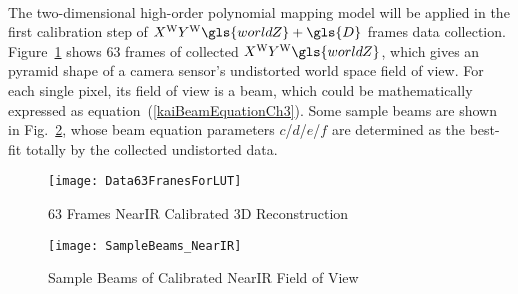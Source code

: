 \\\indent
%
The two-dimensional high-order polynomial mapping model will be applied in the first calibration step of \(X^\text{W}Y^\text{W}\gls{worldZ}+\gls{D}\) frames data collection. Figure~\ref{Data63FranesForLUT} shows 63 frames of collected \(X^\text{W}Y^\text{W}\gls{worldZ}\), which gives an pyramid shape of a camera sensor's undistorted world space field of view. For each single pixel, its field of view is a beam, which could be mathematically expressed as equation~(\ref{kaiBeamEquationCh3}). Some sample beams are shown in Fig.~\ref{SampleBeams_NearIR}, whose beam equation parameters \(c\)/\(d\)/\(e\)/\(f\) are determined as the best-fit totally by the collected undistorted data. 
\begin{figure}[t]
\centering
\texttt{[image: Data63FranesForLUT]}
\caption{63 Frames \gls{NearIR} Calibrated \gls{3D} Reconstruction}
\label{Data63FranesForLUT}
\end{figure}%
%
%
\begin{figure}[t]
\centering
\texttt{[image: SampleBeams\_NearIR]}
\caption{Sample Beams of Calibrated \gls{NearIR} Field of View}
\label{SampleBeams_NearIR}
\end{figure}
%

